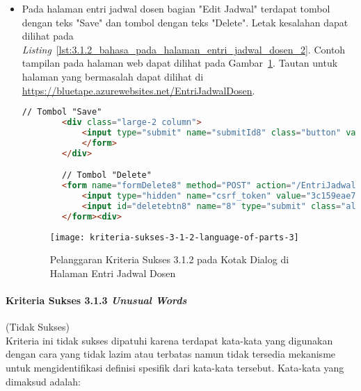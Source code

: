 \begin{itemize}
    \item Pada halaman entri jadwal dosen bagian "Edit Jadwal" terdapat tombol dengan teks "Save" dan tombol dengan teks "Delete". Letak kesalahan dapat dilihat pada \mbox{\textit{Listing} \ref{lst:3.1.2_bahasa_pada_halaman_entri_jadwal_dosen_2}}. Contoh tampilan pada halaman web dapat dilihat pada \mbox{Gambar \ref{fig:3.1.2_language_of_parts_3}}. Tautan untuk halaman yang bermasalah dapat dilihat di \url{https://bluetape.azurewebsites.net/EntriJadwalDosen}.
    \begin{lstlisting}[frame=single, label={lst:3.1.2_bahasa_pada_halaman_entri_jadwal_dosen_2}, language=HTML, caption=Pelanggaran Kriteria Sukses 3.1.2 pada Kotak Dialog di Halaman Entri Jadwal Dosen]
        // Tombol "Save"
        <div class="large-2 column">
            <input type="submit" name="submitId8" class="button" value="Save">
            </form>
        </div>

        // Tombol "Delete"
        <form name="formDelete8" method="POST" action="/EntriJadwalDosen/delete/8">    
            <input type="hidden" name="csrf_token" value="3c159eae7bc953dd591b679c080ed066"/>
            <input id="deletebtn8" name="8" type="submit" class="alert button" value="Delete">
        </form><div>
    \end{lstlisting}
    
    \begin{figure}[H]
        \centering  
        \texttt{[image: kriteria-sukses-3-1-2-language-of-parts-3]}  
        \caption[Pelanggaran Kriteria Sukses 3.1.2 pada Kotak Dialog di Halaman Entri Jadwal Dosen]{Pelanggaran Kriteria Sukses 3.1.2 pada Kotak Dialog di Halaman Entri Jadwal Dosen}
        \label{fig:3.1.2_language_of_parts_3}  
    \end{figure}
\end{itemize}

\paragraph{Kriteria Sukses 3.1.3 \textit{Unusual Words}}
\label{par:kepatuhan_bluetape_kriteria_sukses_3.1.3}
(Tidak Sukses)\\

Kriteria ini tidak sukses dipatuhi karena terdapat kata-kata yang digunakan dengan cara yang tidak lazim atau terbatas namun tidak tersedia mekanisme untuk mengidentifikasi definisi spesifik dari kata-kata tersebut. Kata-kata yang dimaksud adalah:

